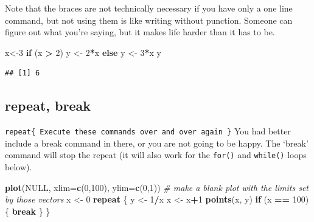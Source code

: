 \documentclass[]{article}
\newenvironment{Shaded}{\begin{snugshade}}{\end{snugshade}}
\newcommand{\KeywordTok}[1]{\textcolor[rgb]{0.13,0.29,0.53}{\textbf{#1}}}
\newcommand{\DataTypeTok}[1]{\textcolor[rgb]{0.13,0.29,0.53}{#1}}
\newcommand{\DecValTok}[1]{\textcolor[rgb]{0.00,0.00,0.81}{#1}}
\newcommand{\StringTok}[1]{\textcolor[rgb]{0.31,0.60,0.02}{#1}}
\newcommand{\CommentTok}[1]{\textcolor[rgb]{0.56,0.35,0.01}{\textit{#1}}}
\newcommand{\OtherTok}[1]{\textcolor[rgb]{0.56,0.35,0.01}{#1}}
\newcommand{\ControlFlowTok}[1]{\textcolor[rgb]{0.13,0.29,0.53}{\textbf{#1}}}
\newcommand{\OperatorTok}[1]{\textcolor[rgb]{0.81,0.36,0.00}{\textbf{#1}}}
\newcommand{\NormalTok}[1]{#1}
\begin{document}
Note that the braces are not technically necessary if you have only a
one line command, but not using them is like writing without punction.
Someone can figure out what you're saying, but it makes life harder than
it has to be.

\begin{Shaded}
\begin{Highlighting}[]
\NormalTok{x<-}\DecValTok{3}
\ControlFlowTok{if}\NormalTok{ (x }\OperatorTok{>}\StringTok{ }\DecValTok{2}\NormalTok{) y <-}\StringTok{ }\DecValTok{2}\OperatorTok{*}\NormalTok{x }\ControlFlowTok{else}\NormalTok{ y <-}\StringTok{ }\DecValTok{3}\OperatorTok{*}\NormalTok{x}
\NormalTok{y}
\end{Highlighting}
\end{Shaded}

\begin{verbatim}
## [1] 6
\end{verbatim}

\clearpage

\subsection{repeat, break}\label{repeat-break}

\texttt{repeat\{\ Execute\ these\ commands\ over\ and\ over\ again\ \}}
You had better include a break command in there, or you are not going to
be happy. The `break' command will stop the repeat (it will also work
for the \texttt{for()} and \texttt{while()} loops below).

\begin{Shaded}
\begin{Highlighting}[]
\KeywordTok{plot}\NormalTok{(}\OtherTok{NULL}\NormalTok{, }\DataTypeTok{xlim=}\KeywordTok{c}\NormalTok{(}\DecValTok{0}\NormalTok{,}\DecValTok{100}\NormalTok{), }\DataTypeTok{ylim=}\KeywordTok{c}\NormalTok{(}\DecValTok{0}\NormalTok{,}\DecValTok{1}\NormalTok{)) }\CommentTok{# make a blank plot with the limits set by those vectors}
\NormalTok{x <-}\StringTok{ }\DecValTok{0}
\ControlFlowTok{repeat}\NormalTok{ \{}
\NormalTok{  y <-}\StringTok{ }\DecValTok{1}\OperatorTok{/}\NormalTok{x}
\NormalTok{  x <-}\StringTok{ }\NormalTok{x}\OperatorTok{+}\DecValTok{1}
  \KeywordTok{points}\NormalTok{(x, y)}
  \ControlFlowTok{if}\NormalTok{ (x }\OperatorTok{==}\StringTok{ }\DecValTok{100}\NormalTok{) \{ }\ControlFlowTok{break}\NormalTok{ \}}
\NormalTok{\}}
\end{Highlighting}
\end{Shaded}
\end{document}

